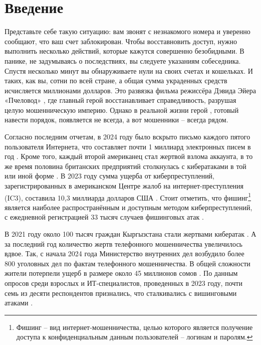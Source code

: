 \section*{\centering Введение}

Представьте себе такую ситуацию: вам звонят с незнакомого номера и уверенно сообщают, что ваш счет заблокирован. Чтобы восставновить доступ, нужно выполнить несколько действий, которые кажутся совершенно безобидными. В панике, не задумываясь о последствиях, вы следуете указаниям собеседника. Спустя несколько минут вы обнаруживаете нули на своих счетах и кошельках. И таких, как вы, сотни по всей стране, а общая сумма украденных средств исчисляется миллионами долларов. Это развязка фильма режиссёра Дэвида Эйера «Пчеловод» \cite{beekeeper2024}, где главный герой восстанавливает справедливость, разрушая целую мошенническую империю. Однако в реальной жизни герой \cite{fraud2024}, готовый навести порядок, появляется не всегда, а вот мошенники – всегда рядом.

Согласно последним отчетам, в 2024 году было вскрыто письмо каждого пятого пользователя Интернета, что составляет почти 1 миллиард электронных писем в год \cite{griffiths2024phishing}. Кроме того, каждый второй американец стал жертвой взлома аккаунта, в то же время половина британских предприятий столкнулась с кибератаками в той или иной форме \cite{griffiths2024cybercrime}. В 2023 году сумма ущерба от киберпреступлений, зарегистрированных в американском Центре жалоб на интернет-преступления (IC3), составила 10,3 миллиарда долларов США \cite{petrosyan2023}. Стоит отметить, что фишинг\footnote{Фишинг –  вид интернет-мошенничества, целью которого является получение доступа к конфиденциальным данным пользователей – логинам и паролям.} является наиболее распространённым и доступным методом киберпреступлений, с ежедневной регистрацией 33 тысяч случаев фишинговых атак \cite{lewis2018}. 

В 2021 году около 100 тысяч граждан Кыргызстана стали жертвами кибератак \cite{kopytin2023}. А за последний год количество жертв телефонного мошенничества увеличилось вдвое. Так, с начала 2024 года Министерство внутренних дел возбудило более 800 уголовных дел по фактам телефонного мошенничества. В общей сложности жители потерпели ущерб в размере около 45 миллионов сомов \cite{amatbekova2024}. По данным опросов среди взрослых и ИТ-специалистов, проведенных в 2023 году, почти семь из десяти респондентов признались, что сталкивались с вишинговыми атаками \cite{petrosyan2024}.

